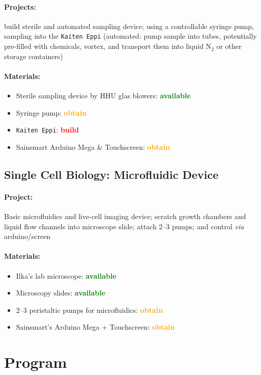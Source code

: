 \documentclass[12pt,a4paper]{scrartcl}
\newcommand{\obtain}[0]{\textcolor{orange}{\textbf{obtain}}}
\newcommand{\avail}[0]{\textcolor{green}{\textbf{available}}}
\newcommand{\build}[0]{\textcolor{red}{\textbf{build}}}
\begin{document}
\paragraph{Projects:} build sterile and automated sampling device; using
a controllable syringe pump, sampling into the \texttt{Kaiten Eppi}
(automated: pump sample into tubes, potentially pre-filled with
chemicals, vortex, and transport them into liquid N$_2$ or other
storage containers)

\paragraph{Materials:}
\begin{itemize}
\item Sterile sampling device by HHU glas blowers: \avail{}
\item Syringe pump: \obtain{}
\item \texttt{Kaiten Eppi}: \build{}
\item Sainsmart Arduino Mega \& Touchscreen: \obtain{}
\end{itemize}


\newpage
\subsection{Single Cell Biology: Microfluidic Device} 
\label{micro}

\paragraph{Project:} Basic microfluidics and live-cell imaging device;
scratch growth chambers and liquid flow channels into microscope slide;
attach 2--3 pumps; and control \textit{via} arduino/screen

\paragraph{Materials:}
\begin{itemize}
\item Ilka's lab microscope: \avail{}
\item Microscopy slides: \avail{}
\item 2--3 peristaltic pumps for microfluidics: \obtain{}
\item Sainsmart's Arduino Mega + Touchscreen: \obtain{}
\end{itemize}


\newpage

\section{Program}
\end{document}
